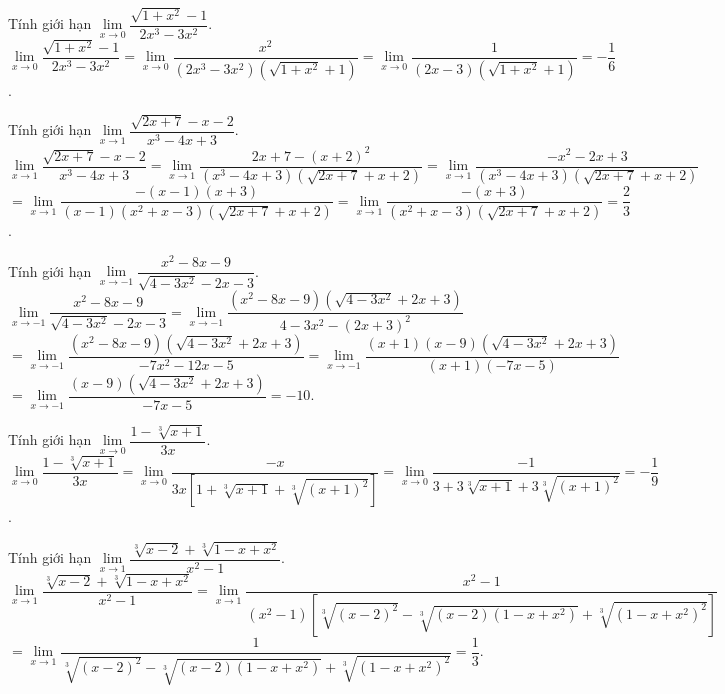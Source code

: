 \begin{bt}%
Tính giới hạn $\lim\limits_{x \to 0}\dfrac{\sqrt{1+x^2} - 1}{2x^3 - 3x^2}$.
\loigiai
{
$\lim\limits_{x \to 0}\dfrac{\sqrt{1+x^2} - 1}{2x^3 - 3x^2} = \lim\limits_{x \to 0}\dfrac{x^2}{(2x^3 - 3x^2) \left(\sqrt{1+x^2} + 1\right)} = \lim\limits_{x \to 0}\dfrac{1}{(2x - 3) \left(\sqrt{1+x^2} + 1\right)} = -\dfrac{1}{6}$.
}
\end{bt}


\begin{bt}%
Tính giới hạn $\lim\limits_{x \to 1}\dfrac{\sqrt{2x+7} - x - 2}{x^3 - 4x + 3}$.
\loigiai
{
$\lim\limits_{x \to 1}\dfrac{\sqrt{2x+7} - x - 2}{x^3 - 4x + 3} = \lim\limits_{x \to 1}\dfrac{2x+7-(x+2)^2}{(x^3-4x+3)\left(\sqrt{2x+7}+x+2\right)} = \lim\limits_{x \to 1}\dfrac{-x^2 - 2x + 3}{(x^3-4x+3)\left(\sqrt{2x+7}+x+2\right)}$\\
$= \lim\limits_{x \to 1}\dfrac{-(x-1)(x+3)}{(x-1)(x^2+x-3)\left(\sqrt{2x+7}+x+2\right)} = \lim\limits_{x \to 1}\dfrac{-(x+3)}{(x^2+x-3)\left(\sqrt{2x+7}+x+2\right)} = \dfrac{2}{3}$.
}
\end{bt}


\begin{bt}%
Tính giới hạn $\lim\limits_{x \to -1}\dfrac{x^2 - 8x - 9}{\sqrt{4-3x^2} - 2x - 3}$.
\loigiai
{
$\lim\limits_{x \to -1}\dfrac{x^2 - 8x - 9}{\sqrt{4-3x^2} - 2x - 3} = \lim\limits_{x \to -1}\dfrac{(x^2 - 8x - 9)\left(\sqrt{4-3x^2} + 2x + 3\right)}{4 - 3x^2 - (2x + 3)^2}$\\
$= \lim\limits_{x \to -1}\dfrac{(x^2 - 8x - 9)\left(\sqrt{4 - 3x^2} + 2x + 3\right)}{-7x^2 - 12x - 5} = \lim\limits_{x \to -1}\dfrac{(x+1)(x-9)\left(\sqrt{4-3x^2} + 2x + 3\right)}{(x+1)(-7x - 5)}$\\
$= \lim\limits_{x \to -1}\dfrac{(x - 9) \left(\sqrt{4 - 3x^2} + 2x + 3\right)}{-7x - 5} = -10$.
}
\end{bt}


\begin{bt}%
Tính giới hạn $\lim\limits_{x \to 0}\dfrac{1 - \sqrt[3]{x+1}}{3x}$.
\loigiai
{
$\lim\limits_{x \to 0}\dfrac{1 - \sqrt[3]{x+1}}{3x} = \lim\limits_{x \to 0}\dfrac{-x}{3x\left[1 + \sqrt[3]{x+1} + \sqrt[3]{(x+1)^2}\right]} = \lim\limits_{x \to 0}\dfrac{-1}{3 + 3\sqrt[3]{x+1} + 3\sqrt[3]{(x+1)^2}} = -\dfrac{1}{9}$.
}
\end{bt}


\begin{bt}%
Tính giới hạn $\lim\limits_{x \to 1}\dfrac{\sqrt[3]{x-2} + \sqrt[3]{1-x+x^2}}{x^2-1}$.
\loigiai
{
$\lim\limits_{x \to 1}\dfrac{\sqrt[3]{x-2} + \sqrt[3]{1-x+x^2}}{x^2-1} = \lim\limits_{x \to 1}\dfrac{x^2 - 1}{(x^2 - 1)\left[\sqrt[3]{(x-2)^2} - \sqrt[3]{(x-2)(1-x+x^2)} + \sqrt[3]{(1-x+x^2)^2}\right]}$\\
$= \lim\limits_{x \to 1}\dfrac{1}{\sqrt[3]{(x-2)^2} - \sqrt[3]{(x-2)(1-x+x^2)} + \sqrt[3]{(1-x+x^2)^2}} = \dfrac{1}{3}$.
}
\end{bt}



